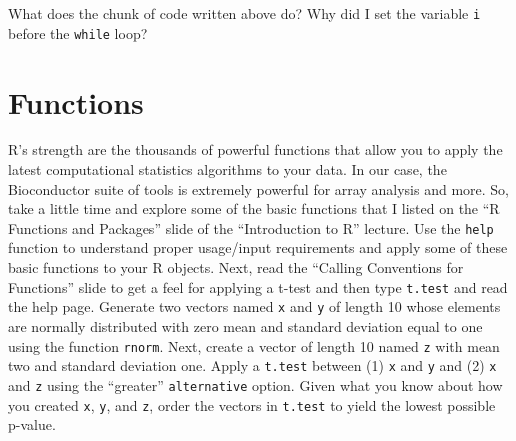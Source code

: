 \documentclass[12pt]{article}
\newcommand{\code}[1]{{\texttt{#1}}}
\begin{document}
What does the chunk of code written above do?  Why did I set the variable \code{i} before the \code{while} loop?

\section{Functions}

R's strength are the thousands of powerful functions that allow you to apply the latest computational statistics algorithms to your data.  In our case, the Bioconductor suite of tools is extremely powerful for array analysis and more.  So, take a little time and explore some of the basic functions that I listed on the ``R Functions and Packages'' slide of the ``Introduction to R'' lecture.  Use the \code{help} function to understand proper usage/input requirements and apply some of these basic functions to your R objects.  Next, read the ``Calling Conventions for Functions'' slide to get a feel for applying a t-test and then type \code{t.test} and read the help page.  Generate two vectors named \code{x} and \code{y} of length 10 whose elements are normally distributed with zero mean and standard deviation equal to one using the function \code{rnorm}.  Next, create a vector of length 10 named \code{z} with mean two and standard deviation one.  Apply a \code{t.test} between (1) \code{x} and \code{y} and (2) \code{x} and \code{z} using the ``greater'' \code{alternative} option.  Given what you know about how you created \code{x}, \code{y}, and \code{z}, order the vectors in \code{t.test} to yield the lowest possible p-value.  
\end{document}

